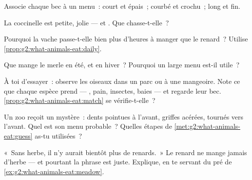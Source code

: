 \begin{exercise}[$\star$]\label{exo:g2:what-animals-eat:4}
Associe chaque bec à un menu~: court et épais~; courbé et crochu~;
long et fin.
\end{exercise}

\begin{exercise}[$\star$]\label{exo:g2:what-animals-eat:5}
La coccinelle est petite, jolie --- et . Que chasse-t-elle~?
\end{exercise}

\begin{exercise}[$\star$]\label{exo:g2:what-animals-eat:6}
Pourquoi la vache passe-t-elle bien plus d'heures à manger que le
renard~? Utilise \cref{prop:g2:what-animals-eat:daily}.
\end{exercise}

\begin{exercise}[$\star$]\label{exo:g2:what-animals-eat:7}
Que mange le merle en été, et en hiver~? Pourquoi un large menu
est-il utile~?
\end{exercise}

\begin{exercise}[$\star$]\label{exo:g2:what-animals-eat:8}
À toi d'essayer~: observe les oiseaux dans un parc ou à une
mangeoire. Note ce que chaque espèce prend --- , pain,
insectes, baies --- et regarde leur bec.
\cref{prop:g2:what-animals-eat:match} se vérifie-t-elle~?
\end{exercise}

\begin{exercise}[$\star\star$]\label{exo:g2:what-animals-eat:9}
Un zoo reçoit un  mystère~: dents pointues à l'avant, griffes
acérées,  tournés vers l'avant. Quel est son menu probable~?
Quelles étapes de \cref{met:g2:what-animals-eat:guess} as-tu
utilisées~?
\end{exercise}

\begin{exercise}[$\star\star$]\label{exo:g2:what-animals-eat:10}
«~Sans herbe, il n'y aurait bientôt plus de renards.~» Le renard ne
mange jamais d'herbe --- et pourtant la phrase est juste. Explique,
en te servant du pré de \cref{ex:g2:what-animals-eat:meadow}.
\end{exercise}
